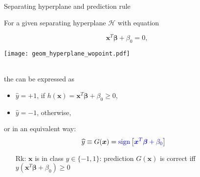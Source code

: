 \begin{frame}{Separating hyperplane and prediction rule}

 For a given separating {hyperplane} $\mathcal{H}$ with equation \medskip \\
  \begin{minipage}{.4\textwidth}
\begin{center}
                   $$
 \boldsymbol{x}^T \boldsymbol{\beta} + \beta_0 = 0,
 $$
\end{center}
\end{minipage}
\quad
 \begin{minipage}{.3\textwidth}
  \begin{center}
   \texttt{[image: geom\_hyperplane\_wopoint.pdf]}
  \end{center}
 \end{minipage} \bigskip \\
 the  can be expressed as
\begin{itemize}
 \item $\widehat{y}=+1$, if $h(\boldsymbol{x})= \boldsymbol{x}^T \boldsymbol{\beta} + \beta_0 \ge 0$,
 \item  $\widehat{y}=-1$, otherwise,
\end{itemize}
or in an equivalent way:
\begin{align*}
 \widehat{y} &\equiv G(\boldsymbol{x}) = {\textcolor{blue}{ \operatorname{sign}{\left[  \boldsymbol{x}^T \boldsymbol{\beta} + \beta_0 \right]} }}
\end{align*}

\begin{itemize}
 \item[Rk:] $\boldsymbol{x}$ is in class  $y \in\{-1,1\}$: prediction $G(\boldsymbol{x})$ is correct %
 iff $y \left(  \boldsymbol{x}^T \boldsymbol{\beta} + \beta_0 \right )  \ge 0$
 \end{itemize}

\end{frame}




